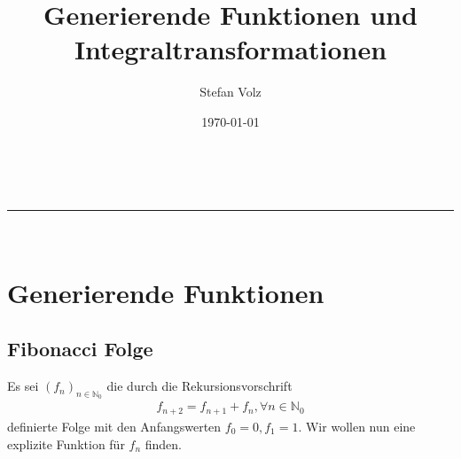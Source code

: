 \documentclass[a4paper,11pt]{article}
\makeatletter
\newcommand{\linia}{\rule{\linewidth}{0.5pt}}
\theoremstyle{mytheor}
\renewcommand{\maketitle}{
\begin{center}
\vspace{2ex}
{\huge \textsc{\@title}}
\vspace{1ex}
\\
\linia\\
\@author \hfill \@date
\vspace{4ex}
\end{center}
}
\newcommand{\N}[0]{\mathbb{N}}
\makeatother
\begin{document}
\title{Generierende Funktionen und Integraltransformationen}

\author{Stefan Volz}

\date{\today}

\maketitle

\section{Generierende Funktionen}

\subsection{Fibonacci Folge}

Es sei $(f_n)_{n \in \N_0}$ die durch die Rekursionsvorschrift
\begin{align*}
    f_{n+2} = f_{n+1} + f_n, \forall n \in \N_0
\end{align*}
definierte Folge mit den Anfangswerten $f_0 = 0, f_1 = 1$.
Wir wollen nun eine explizite Funktion für $f_n$ finden.
\end{document}
